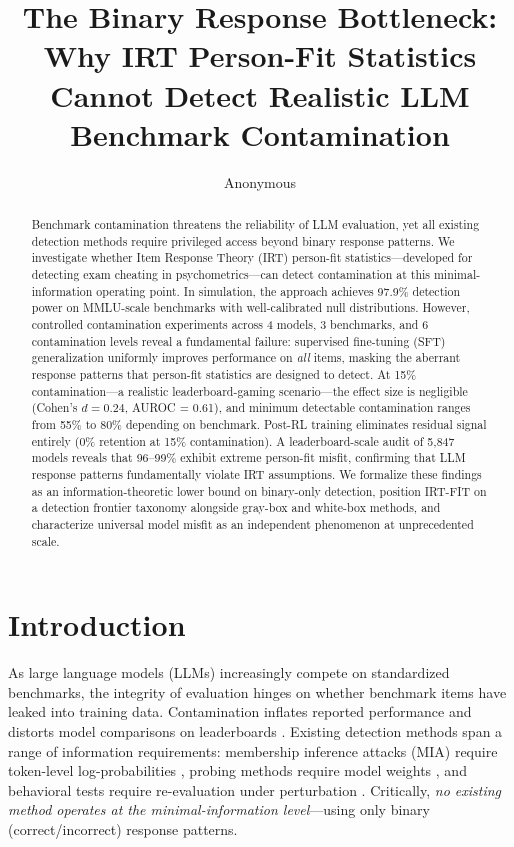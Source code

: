 \documentclass[11pt,a4paper]{article}
\title{The Binary Response Bottleneck: Why IRT Person-Fit Statistics Cannot Detect Realistic LLM Benchmark Contamination}
\author{Anonymous}
\begin{document}
\maketitle

\begin{abstract}
Benchmark contamination threatens the reliability of LLM evaluation, yet all existing detection methods require privileged access beyond binary response patterns.
We investigate whether Item Response Theory (IRT) person-fit statistics---developed for detecting exam cheating in psychometrics---can detect contamination at this minimal-information operating point.
In simulation, the approach achieves 97.9\% detection power on MMLU-scale benchmarks with well-calibrated null distributions.
However, controlled contamination experiments across 4 models, 3 benchmarks, and 6 contamination levels reveal a fundamental failure: supervised fine-tuning (SFT) generalization uniformly improves performance on \emph{all} items, masking the aberrant response patterns that person-fit statistics are designed to detect.
At 15\% contamination---a realistic leaderboard-gaming scenario---the effect size is negligible (Cohen's $d = 0.24$, AUROC = 0.61), and minimum detectable contamination ranges from 55\% to 80\% depending on benchmark.
Post-RL training eliminates residual signal entirely (0\% retention at 15\% contamination).
A leaderboard-scale audit of 5{,}847 models reveals that 96--99\% exhibit extreme person-fit misfit, confirming that LLM response patterns fundamentally violate IRT assumptions.
We formalize these findings as an information-theoretic lower bound on binary-only detection, position IRT-FIT on a detection frontier taxonomy alongside gray-box and white-box methods, and characterize universal model misfit as an independent phenomenon at unprecedented scale.
\end{abstract}

\section{Introduction}

As large language models (LLMs) increasingly compete on standardized benchmarks, the integrity of evaluation hinges on whether benchmark items have leaked into training data.
Contamination inflates reported performance and distorts model comparisons on leaderboards \cite{jacobs2023contamination,li2024task}.
Existing detection methods span a range of information requirements: membership inference attacks (MIA) require token-level log-probabilities \cite{shi2024detecting}, probing methods require model weights \cite{oren2024proving}, and behavioral tests require re-evaluation under perturbation \cite{golchin2024time,li2024constat}.
Critically, \emph{no existing method operates at the minimal-information level}---using only binary (correct/incorrect) response patterns.
\end{document}
